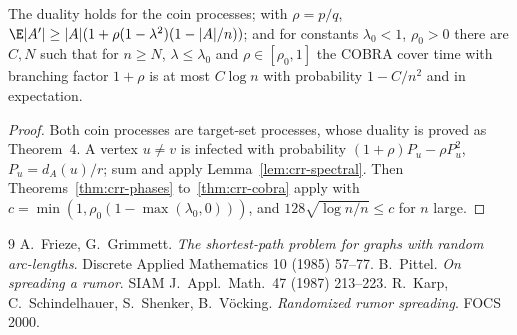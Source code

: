 \begin{theorem}\label{thm:crr-coin}
\leanok{}
The duality holds for the coin processes; with $\rho=p/q$,
$\E|A'|\ge|A|(1+\rho(1-\lambda^2)(1-|A|/n))$; and for constants $\lambda_0<1$, $\rho_0>0$ there
are $C,N$ such that for $n\ge N$, $\lambda\le\lambda_0$ and $\rho\in[\rho_0,1]$ the COBRA cover time
with branching factor $1+\rho$ is at most $C\log n$ with probability $1-C/n^2$ and in expectation.
\end{theorem}
\begin{proof}\leanok
Both coin processes are target-set processes, whose duality is proved as Theorem~4. A vertex
$u\ne v$ is infected with probability $(1+\rho)P_u-\rho P_u^2$, $P_u=d_A(u)/r$; sum and apply
Lemma~\ref{lem:crr-spectral}. Then Theorems~\ref{thm:crr-phases} to~\ref{thm:crr-cobra} apply
with $c=\min(1,\rho_0(1-\max(\lambda_0,0)))$, and $128\sqrt{\log n/n}\le c$ for $n$ large.
\end{proof}

\begin{thebibliography}{9}
 A.~Frieze, G.~Grimmett.
\emph{The shortest-path problem for graphs with random arc-lengths}.
Discrete Applied Mathematics 10 (1985) 57--77.
 B.~Pittel.
\emph{On spreading a rumor}. SIAM J.\ Appl.\ Math.\ 47 (1987) 213--223.
 R.~Karp, C.~Schindelhauer, S.~Shenker, B.~V\"ocking.
\emph{Randomized rumor spreading}. FOCS 2000.
\end{thebibliography}
